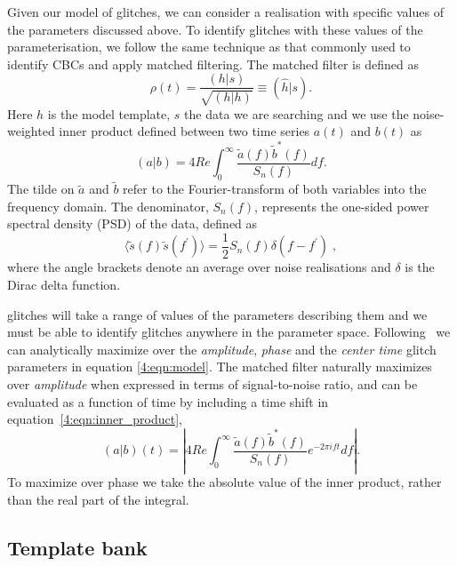 Given our model of \scl{} glitches, we can consider a realisation with specific values of the parameters discussed above. To identify glitches with these values of the parameterisation, we follow the same technique as that commonly used to identify CBCs and apply matched filtering. The matched filter is defined as~\cite{FINDCHIRP:2012}
%
\begin{equation}
  \rho(t) = \frac{(h | s)}{\sqrt{(h | h)}} \equiv (\hat{h} | s).
  \label{4:eqn:mf_1}
\end{equation}
%
Here $h$ is the model template, $s$ the \gw{} data we are searching and we use the noise-weighted inner product defined between two time series $a(t)$ and $b(t)$ as
%
\begin{equation}
  (a | b) = 4 Re \int^{\infty}_{0} \frac{\tilde{a}(f) \tilde{b}^*(f)}{S_n(f)} 
  df.
  \label{4:eqn:inner_product}
\end{equation}
%
The tilde on $\tilde{a}$ and $\tilde{b}$ refer to the Fourier-transform of both variables into the frequency domain. The denominator, $S_n(f)$, represents the one-sided power spectral density (PSD) of the data, defined as
%
\begin{equation}
  \langle \tilde{s}(f) \tilde{s}(f^\prime) \rangle = \frac{1}{2} S_n(f) \delta(f - f^\prime) \;,
  \label{4:eqn:psd}
\end{equation}
%
where the angle brackets denote an average over noise realisations and $\delta$ is the Dirac delta function.

\Scl{} glitches will take a range of values of the parameters describing them and we must be able to identify glitches anywhere in the parameter space. Following~\cite{FINDCHIRP:2012} we can analytically maximize over the \emph{amplitude}, \emph{phase} and the \emph{center time} glitch parameters in equation \ref{4:eqn:model}. The matched filter naturally maximizes over \emph{amplitude} when expressed in terms of signal-to-noise ratio, and can be evaluated as a function of time by including a time shift in equation~\ref{4:eqn:inner_product},
%
\begin{equation}
  (a | b)(t) = \left| 4 Re \int^{\infty}_{0} \frac{\tilde{a}(f) \tilde{b}^*(f)}{S_n(f)} 
  e^{-2 \pi i f t} 
  df \right|.
  \label{4:eqn:inner_product_time}
\end{equation}
%
To maximize over phase we take the absolute value of the inner product, rather than the real part of the integral.

\subsection{Template bank}

